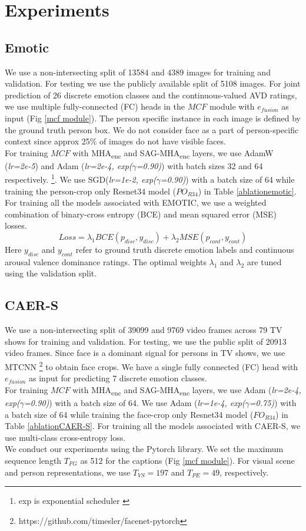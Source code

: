 \section{Experiments}
\subsection{Emotic}
We use a non-intersecting split of 13584 and 4389 images for training and validation. For testing we use the publicly available split of 5108 images. For joint prediction of 26 discrete emotion classes and the continuous-valued AVD ratings, we use multiple fully-connected (FC) heads in the $MCF$ module with $e_{fusion}$ as input (Fig \ref{mcf module}). The person specific instance in each image is defined by the ground truth person box. We do not consider face as a part of person-specific context since approx 25\% of images do not have visible faces. \\
For training $MCF$ with MHA\textsubscript{enc} and SAG-MHA\textsubscript{enc} layers, we use AdamW \cite{AdamW} (\textit{lr=2e-5}) and Adam \cite{Adam} (\textit{lr=2e-4,  exp($\gamma$=0.90)}) with batch sizes 32 and 64 respectively. \footnote{exp is exponential scheduler \label{note1}}. We use SGD(\textit{lr=1e-2, exp($\gamma$=0.90)}) with a batch size of 64 while training the person-crop only Resnet34 model ($PO_{R34}$) in Table \ref{ablationemotic}. For training all the models associated with EMOTIC, we use a weighted combination of binary-cross entropy (BCE) and mean squared error (MSE) losses.
\begin{equation}
Loss =\lambda_{1} BCE(p_{disc},y_{disc}) + \lambda_{2} MSE(p_{cont},y_{cont})
\end{equation}
Here $y_{disc}$ and $y_{cont}$ refer to ground truth discrete emotion labels and continuous arousal valence dominance ratings. The optimal weights $\lambda_{1}$ and $\lambda_{2}$ are tuned using the validation split. 
\subsection{CAER-S}
We use a non-intersecting split of 39099 and 9769 video frames across 79 TV shows for training and validation. For testing, we use the public split of 20913 video frames. Since face is a dominant signal for persons in TV shows, we use MTCNN \cite{MTCNN} \footnote{https://github.com/timesler/facenet-pytorch} to obtain face crops. We have a single fully connected (FC) head with $e_{fusion}$ as input for predicting 7 discrete emotion classes. \\
For training $MCF$ with MHA\textsubscript{enc} and SAG-MHA\textsubscript{enc} layers, we use Adam (\textit{lr=2e-4, exp($\gamma$=0.90)}) with a batch size of 64. We use Adam (\textit{lr=1e-4, exp($\gamma$=0.75)}) with a batch size of 64 while training the face-crop only Resnet34 model ($FO_{R34}$) in Table \ref{ablationCAER-S}. For training all the models associated with CAER-S, we use multi-class cross-entropy loss.
\\
We conduct our experiments using the Pytorch \cite{Paszke2019PyTorchAI} library. We set the maximum sequence length $T_{FG}$ as 512 for the captions (Fig \ref{mcf module}). For visual scene and person representations, we use $T_{VS}=197$ and $T_{PE}=49$, respectively.

